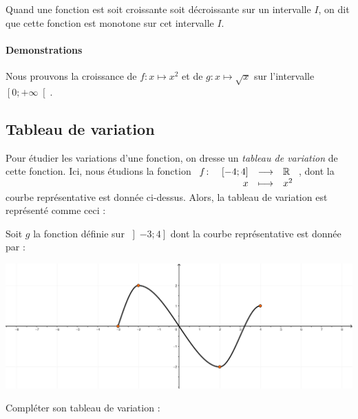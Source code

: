 \documentclass[poly]{mesCours}
\begin{document}
\vspace*{1cm}
Quand une fonction est soit croissante soit décroissante sur un intervalle $I$, on dit que cette fonction est monotone sur cet intervalle $I$.
\paragraph{Demonstrations}
Nous prouvons la croissance de $f : x \mapsto x^2$ et de $g : x \mapsto \sqrt{x}$ sur l'intervalle $\left[0;+\infty\right[$.

\vspace{1cm}
\emptybox{10cm}
\subsection{Tableau de variation}
\begin{center}
\end{center}
\vspace*{1cm}
Pour étudier les variations d'une fonction, on dresse un \emph{tableau de variation} de cette fonction. Ici, nous étudions la fonction $\begin{array}[t]{lrcl} f\colon & \left[-4;4\right] & \longrightarrow & \mathbb{R} \\ & x & \longmapsto & x^2 \end{array}$, dont la courbe représentative est donnée ci-dessus. Alors, la tableau de variation est représenté comme ceci :
\begin{center}
\end{center}
\begin{example}
Soit $g$ la fonction définie sur $\left]-3;4\right]$ dont la courbe représentative est donnée par :
\begin{center}
\includegraphics{Polynome1.png}
\end{center}
Compléter son tableau de variation :
\begin{center}
\end{center}
\end{example}
\end{document}
